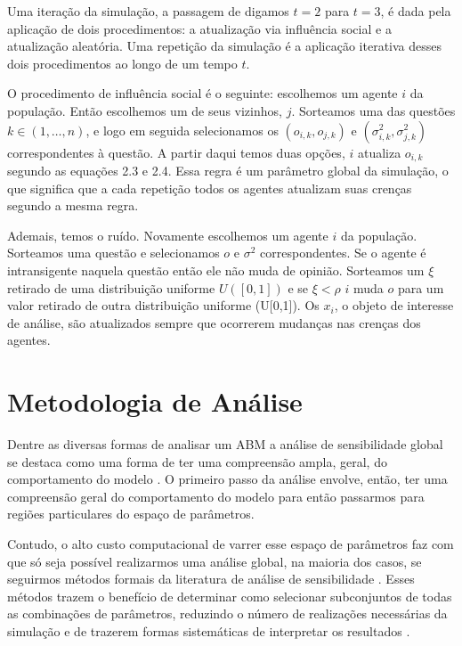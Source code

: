  Uma iteração da simulação, a
passagem de digamos \(t=2\) para \(t=3\), é dada pela aplicação de dois
procedimentos: a atualização via influência social e a atualização aleatória.
Uma repetição da simulação é a aplicação iterativa desses dois procedimentos ao
longo de um tempo \(t \).

O procedimento de influência social é o seguinte: escolhemos um agente \(i\) da
população. Então escolhemos um de seus vizinhos, \(j\). Sorteamos uma das
questões \(k \in (1,\ldots,n)\), e logo em seguida selecionamos os
\((o_{i,k},o_{j,k})\) e \((\sigma_{i,k}^2,\sigma_{j,k}^2)\) correspondentes à questão. A
partir daqui temos duas opções, \(i\) atualiza \(o_{i,k}\) segundo as equações
2.3 e 2.4. Essa regra é um parâmetro global da simulação, o que significa que a
cada repetição todos os agentes atualizam suas crenças segundo a mesma regra.

Ademais, temos o ruído. Novamente escolhemos um agente \(i\) da população.
Sorteamos uma questão e selecionamos \(o\) e \(\sigma^2\) correspondentes. Se o
agente é intransigente naquela questão então ele não muda de opinião. Sorteamos
um \(\xi\) retirado de uma distribuição uniforme \(U([0,1])\) e se \(\xi < \rho\) \(i\)
muda \(o\) para um valor retirado de outra distribuição uniforme (U[0,1]). Os
\(x_i\), o objeto de interesse de análise, são atualizados sempre que ocorrerem
mudanças nas crenças dos agentes.

\section{Metodologia de Análise}

Dentre as diversas formas de analisar um ABM a análise de sensibilidade global
se destaca como uma forma de ter uma compreensão ampla, geral, do comportamento
do modelo \cite{north2007managing}. O primeiro passo da análise envolve, então,
 ter uma compreensão geral do comportamento do modelo para então passarmos
para regiões particulares do espaço de parâmetros.

Contudo, o alto custo computacional de varrer esse espaço de parâmetros faz com
que só seja possível realizarmos uma análise global, na maioria dos casos, se
seguirmos métodos formais da literatura de análise de sensibilidade
\cite{railsback2012agent}. Esses métodos trazem o benefício de determinar como
selecionar subconjuntos de todas as combinações de parâmetros, reduzindo o
número de realizações necessárias da simulação e de trazerem formas sistemáticas
de interpretar os resultados \cite{railsback2012agent}.

